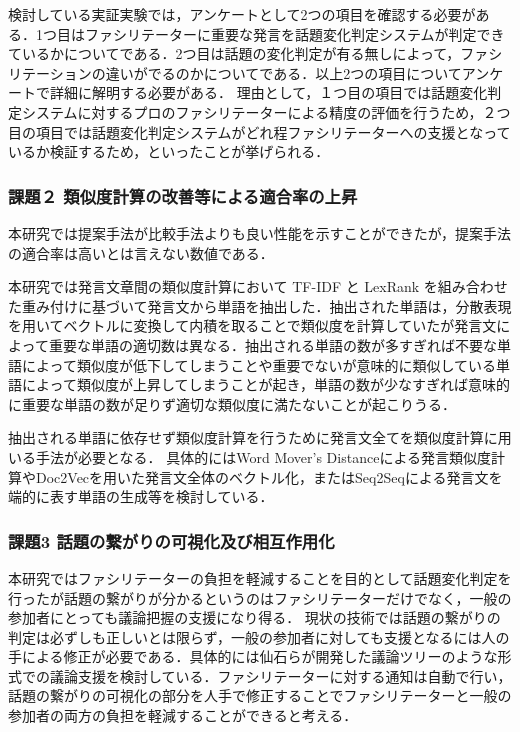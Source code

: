 検討している実証実験では，アンケートとして2つの項目を確認する必要がある．1つ目はファシリテーターに重要な発言を話題変化判定システムが判定できているかについてである．2つ目は話題の変化判定が有る無しによって，ファシリテーションの違いがでるのかについてである．以上2つの項目についてアンケートで詳細に解明する必要がある．
理由として，１つ目の項目では話題変化判定システムに対するプロのファシリテーターによる精度の評価を行うため，２つ目の項目では話題変化判定システムがどれ程ファシリテーターへの支援となっているか検証するため，といったことが挙げられる．

\subsubsection*{課題２  類似度計算の改善等による適合率の上昇}
本研究では提案手法が比較手法よりも良い性能を示すことができたが，提案手法の適合率は高いとは言えない数値である．

本研究では発言文章間の類似度計算において TF-IDF と LexRank を組み合わせた重み付けに基づいて発言文から単語を抽出した．抽出された単語は，分散表現を用いてベクトルに変換して内積を取ることで類似度を計算していたが発言文によって重要な単語の適切数は異なる．抽出される単語の数が多すぎれば不要な単語によって類似度が低下してしまうことや重要でないが意味的に類似している単語によって類似度が上昇してしまうことが起き，単語の数が少なすぎれば意味的に重要な単語の数が足りず適切な類似度に満たないことが起こりうる．

抽出される単語に依存せず類似度計算を行うために発言文全てを類似度計算に用いる手法が必要となる．
具体的にはWord Mover's Distance\cite{kusner2015word}による発言類似度計算やDoc2Vec\cite{doc2vec2014}を用いた発言文全体のベクトル化，またはSeq2Seq\cite{seq2seq2014}による発言文を端的に表す単語の生成等を検討している．

\subsubsection*{課題3 話題の繋がりの可視化及び相互作用化}
本研究ではファシリテーターの負担を軽減することを目的として話題変化判定を行ったが話題の繋がりが分かるというのはファシリテーターだけでなく，一般の参加者にとっても議論把握の支援になり得る．
現状の技術では話題の繋がりの判定は必ずしも正しいとは限らず，一般の参加者に対しても支援となるには人の手による修正が必要である．具体的には仙石らが開発した議論ツリーのような形式での議論支援を検討している．ファシリテーターに対する通知は自動で行い，話題の繋がりの可視化の部分を人手で修正することでファシリテーターと一般の参加者の両方の負担を軽減することができると考える．


